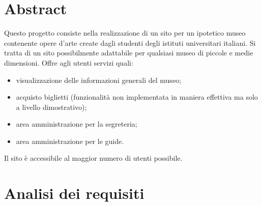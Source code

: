 \documentclass[10pt,a4paper,onecolumn]{article}
\begin{document}
\clearpage
\tableofcontents

\clearpage
\section{Abstract}
Questo progetto consiste nella realizzazione di un sito per un ipotetico museo contenente opere d'arte create dagli studenti degli istituti universitari italiani.
Si tratta di un sito possibilmente adattabile per qualsiasi museo di piccole e medie dimensioni.
Offre agli utenti servizi quali:
\begin{itemize}
\item visualizzazione delle informazioni generali del museo;
\item acquisto biglietti (funzionalità non implementata in maniera effettiva ma solo a livello dimostrativo);
\item area amministrazione per la segreteria;
\item area amministrazione per le guide.
\end{itemize}
Il sito è accessibile al maggior numero di utenti possibile.

\clearpage
\section{Analisi dei requisiti}
\end{document}
